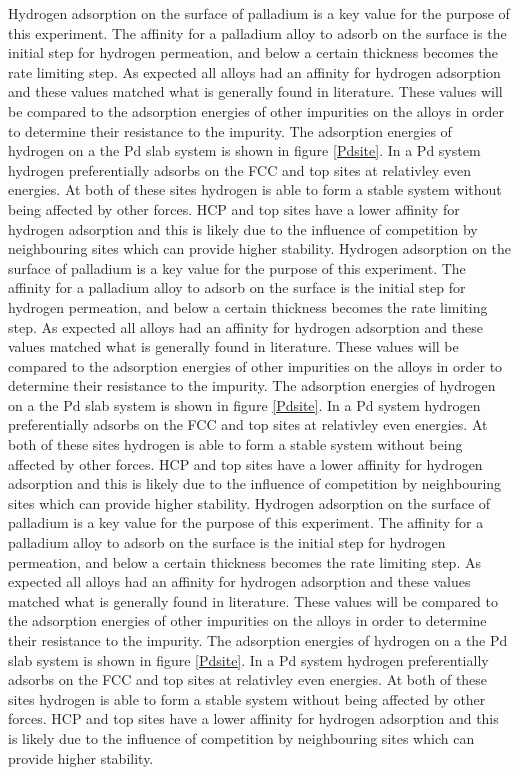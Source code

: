     Hydrogen adsorption on the surface of palladium is a key value for the purpose of this experiment. The affinity for a palladium alloy to adsorb on the surface is the initial step for hydrogen permeation, and below a certain thickness becomes the rate limiting step. As expected all alloys had an affinity for hydrogen adsorption and these values matched what is generally found in literature. These values will be compared to the adsorption energies of other impurities on the alloys in order to determine their resistance to the impurity. The adsorption energies of hydrogen on a the Pd slab system is shown in figure \ref{Pdsite}. In a Pd system hydrogen preferentially adsorbs on the FCC and top sites at relativley even energies. At both of these sites hydrogen is able to form a stable system without being affected by other forces. HCP and top sites have a  lower affinity for hydrogen adsorption and this is likely due to the influence of competition by neighbouring sites which can provide higher stability.
    Hydrogen adsorption on the surface of palladium is a key value for the purpose of this experiment. The affinity for a palladium alloy to adsorb on the surface is the initial step for hydrogen permeation, and below a certain thickness becomes the rate limiting step. As expected all alloys had an affinity for hydrogen adsorption and these values matched what is generally found in literature. These values will be compared to the adsorption energies of other impurities on the alloys in order to determine their resistance to the impurity. The adsorption energies of hydrogen on a the Pd slab system is shown in figure \ref{Pdsite}. In a Pd system hydrogen preferentially adsorbs on the FCC and top sites at relativley even energies. At both of these sites hydrogen is able to form a stable system without being affected by other forces. HCP and top sites have a  lower affinity for hydrogen adsorption and this is likely due to the influence of competition by neighbouring sites which can provide higher stability.
    Hydrogen adsorption on the surface of palladium is a key value for the purpose of this experiment. The affinity for a palladium alloy to adsorb on the surface is the initial step for hydrogen permeation, and below a certain thickness becomes the rate limiting step. As expected all alloys had an affinity for hydrogen adsorption and these values matched what is generally found in literature. These values will be compared to the adsorption energies of other impurities on the alloys in order to determine their resistance to the impurity. The adsorption energies of hydrogen on a the Pd slab system is shown in figure \ref{Pdsite}. In a Pd system hydrogen preferentially adsorbs on the FCC and top sites at relativley even energies. At both of these sites hydrogen is able to form a stable system without being affected by other forces. HCP and top sites have a  lower affinity for hydrogen adsorption and this is likely due to the influence of competition by neighbouring sites which can provide higher stability.


